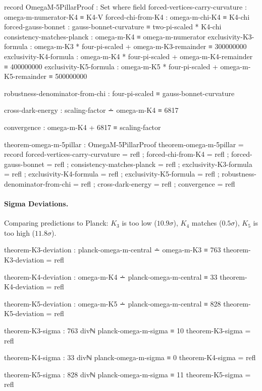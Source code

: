 \documentclass[11pt,a4paper]{book}
\begin{document}
\begin{code}
record OmegaM-5PillarProof : Set where
  field
    forced-vertices-carry-curvature : omega-m-numerator-K4 ≡ K4-V
    forced-chi-from-K4 : omega-m-chi-K4 ≡ K4-chi
    forced-gauss-bonnet : gauss-bonnet-curvature ≡ two-pi-scaled * K4-chi
    consistency-matches-planck : omega-m-K4 ≡ omega-m-numerator
    exclusivity-K3-formula : omega-m-K3 * four-pi-scaled + omega-m-K3-remainder ≡ 300000000
    exclusivity-K4-formula : omega-m-K4 * four-pi-scaled + omega-m-K4-remainder ≡ 400000000
    exclusivity-K5-formula : omega-m-K5 * four-pi-scaled + omega-m-K5-remainder ≡ 500000000
    
    robustness-denominator-from-chi : four-pi-scaled ≡ gauss-bonnet-curvature
    
    cross-dark-energy : scaling-factor ∸ omega-m-K4 ≡ 6817
    
    convergence : omega-m-K4 + 6817 ≡ scaling-factor

theorem-omega-m-5pillar : OmegaM-5PillarProof
theorem-omega-m-5pillar = record
  { forced-vertices-carry-curvature = refl
  ; forced-chi-from-K4 = refl
  ; forced-gauss-bonnet = refl
  ; consistency-matches-planck = refl
  ; exclusivity-K3-formula = refl
  ; exclusivity-K4-formula = refl
  ; exclusivity-K5-formula = refl
  ; robustness-denominator-from-chi = refl
  ; cross-dark-energy = refl
  ; convergence = refl
  }

\end{code}

\paragraph{Sigma Deviations.}
Comparing predictions to Planck:
$K_3$ is too low ($10.9\sigma$), $K_4$ matches ($0.5\sigma$), $K_5$ is too high ($11.8\sigma$).

\begin{code}
theorem-K3-deviation : planck-omega-m-central ∸ omega-m-K3 ≡ 763
theorem-K3-deviation = refl

theorem-K4-deviation : omega-m-K4 ∸ planck-omega-m-central ≡ 33
theorem-K4-deviation = refl

theorem-K5-deviation : omega-m-K5 ∸ planck-omega-m-central ≡ 828
theorem-K5-deviation = refl

theorem-K3-sigma : 763 divℕ planck-omega-m-sigma ≡ 10
theorem-K3-sigma = refl

theorem-K4-sigma : 33 divℕ planck-omega-m-sigma ≡ 0
theorem-K4-sigma = refl

theorem-K5-sigma : 828 divℕ planck-omega-m-sigma ≡ 11
theorem-K5-sigma = refl
\end{code}
\end{document}
